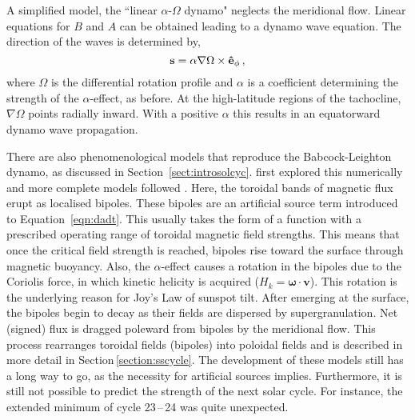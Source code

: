 A simplified model, the ``linear $\alpha$-$\Omega$ dynamo" neglects the meridional flow. Linear equations for $B$ and $A$ can be obtained leading to a dynamo wave equation. The direction of the waves is determined by,
\begin{equation}
\vec{s} = \alpha \nabla \Omega \times \mathbf{\hat{e}}_{\phi} \mbox{\,,}
\end{equation}
where $\Omega$ is the differential rotation profile and $\alpha$ is a coefficient determining the strength of the $\alpha$-effect, as before. At the high-latitude regions of the tachocline, $\nabla \Omega$ points radially inward. With a positive $\alpha$ this results in an equatorward dynamo wave propagation. 

There are also phenomenological models that reproduce the Babcock-Leighton dynamo, as discussed in Section~\ref{sect:introsolcyc}. \cite{Leighton:1964} first explored this numerically and more complete models followed \citep{Nandy:2001}. Here, the toroidal bands of magnetic flux erupt as localised bipoles. These bipoles are an artificial source term introduced to Equation~\ref{eqn:dadt}. This usually takes the form of a function with a prescribed operating range of toroidal magnetic field strengths. This means that once the critical field strength is reached, bipoles rise toward the surface through magnetic buoyancy. Also, the $\alpha$-effect causes a rotation in the bipoles due to the Coriolis force, in which kinetic helicity is acquired ($H_k = \mathbf{\omega} \cdot \mathbf{v}$). This rotation is the underlying reason for Joy's Law of sunspot tilt. After emerging at the surface, the bipoles begin to decay as their fields are dispersed by supergranulation. Net (signed) flux is dragged poleward from bipoles by the meridional flow. This process rearranges toroidal fields (bipoles) into poloidal fields and is described in more detail in Section\,\ref{section:sscycle}.
The development of these models still has a long way to go, as the necessity for artificial sources implies. Furthermore, it is still not possible to predict the strength of the next solar cycle. For instance, the extended minimum of cycle 23\,--\,24 was quite unexpected.




